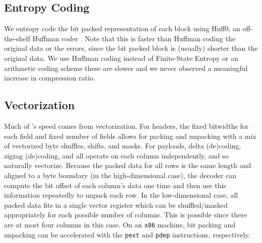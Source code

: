 \subsection{Entropy Coding}

We entropy code the bit packed representation of each block using Huff0, an off-the-shelf Huffman coder \cite{fse}. Note that this is faster than Huffman coding the original data or the errors, since the bit packed block is (usually) shorter than the original data. We use Huffman coding instead of Finite-State Entropy \cite{fse} or an arithmetic coding scheme these are slower and we never observed a meaningful increase in compression ratio.

\subsection{Vectorization}

Much of \mine's speed comes from vectorization. For headers, the fixed bitwidths for each field and fixed number of fields allows for packing and unpacking with a mix of vectorized byte shuffles, shifts, and masks. For payloads, delta (de)coding, zigzag (de)coding, and \fire all operate on each column independently, and so naturally vectorize. Because the packed data for all rows is the same length and aligned to a byte boundary (in the high-dimensional case), the decoder can compute the bit offset of each column's data one time and then use this information repeatedly to unpack each row. In the low-dimensional case, all packed data fits in a single vector register which can be shuffled/masked appropriately for each possible number of columns. This is possible since there are at most four columns in this case. On an \texttt{x86} machine, bit packing and unpacking can be accelerated with the \texttt{pext} and \texttt{pdep} instructions, respectively.
